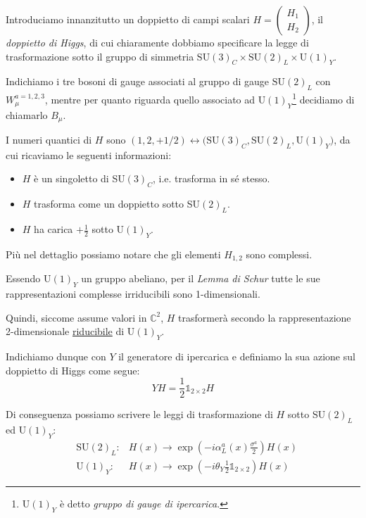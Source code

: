 \documentclass[../main.tex]{subfiles}
\begin{document}
Introduciamo innanzitutto un doppietto di campi scalari $H = \begin{pmatrix} H_1 \\ H_2 \end{pmatrix}$, il \textit{doppietto di Higgs}, di cui chiaramente dobbiamo specificare la legge di trasformazione sotto il gruppo di simmetria $\text{SU}(3)_C\times\text{SU}(2)_L\times\text{U}(1)_Y$.

Indichiamo i tre bosoni di gauge associati al gruppo di gauge $\text{SU}(2)_L$ con $W_\mu^{a=1,2,3}$, mentre per quanto riguarda quello associato ad $\text{U}(1)_Y$\footnote{$\text{U}(1)_Y$ è detto \textit{gruppo di gauge di ipercarica}.} decidiamo di chiamarlo $B_\mu$.

I numeri quantici di $H$ sono $(1,2,+1/2) \leftrightarrow \big(\text{SU}(3)_C,\text{SU}(2)_L,\text{U}(1)_Y\big)$, da cui ricaviamo le seguenti informazioni:
\begin{itemize}
    \item[\blacksquare] $H$ è un singoletto di SU$(3)_C$, i.e. trasforma in sé stesso.
    \item[\blacksquare] $H$ trasforma come un doppietto sotto SU$(2)_L$.
    \item[\blacksquare] $H$ ha carica $+\frac{1}{2}$ sotto U$(1)_Y$.
\end{itemize}

Più nel dettaglio possiamo notare che gli elementi $H_{1,2}$ sono complessi. 

Essendo U$(1)_Y$ un gruppo abeliano, per il \textit{Lemma di Schur} tutte le sue rappresentazioni complesse irriducibili sono 1-dimensionali.

Quindi, siccome assume valori in $\mathbb{C}^2$, $H$ trasformerà secondo la rappresentazione 2-dimensionale \underline{riducibile} di U$(1)_Y$.

Indichiamo dunque con $Y$ il generatore di ipercarica e definiamo la sua azione sul doppietto di Higgs come segue:
\begin{equation}
    \boxed{YH = \frac{1}{2}\mathbb1_{2\times2}H}
    \label{eq:hypercharge_gen_action}
\end{equation}

Di conseguenza possiamo scrivere le leggi di trasformazione di $H$ sotto SU$(2)_L$ ed U$(1)_Y$:
\begin{equation}
    \boxed{\begin{aligned}
        &\text{SU}(2)_L : & H(x)\rightarrow \exp(-i\alpha_L^a(x)\frac{\sigma^a}{2})H(x)\\
        &\text{U}(1)_Y : & H(x)\rightarrow \exp(-i\theta_Y\frac{1}{2}\mathbb1_{2\times2})H(x)
    \end{aligned}}
\end{equation}
\end{document}
